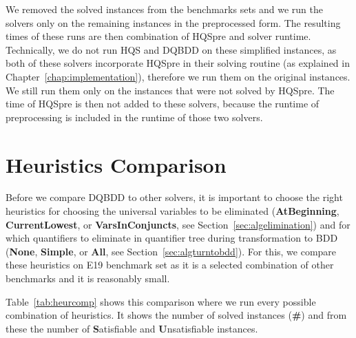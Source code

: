 \documentclass[
  digital, %
  color,
  twoside, %
  table,   %
  nolof,     %
  nolot,     %
]{fithesis3}
\theoremstyle{definition}
\theoremstyle{remark}
\newcommand{\QEnone}{\textbf{None}}
\newcommand{\QEsimple}{\textbf{Simple}}
\newcommand{\QEall}{\textbf{All}}
\newcommand{\QUatbeginning}{\textbf{At\-Be\-gin\-ning}}
\newcommand{\QUcurrentlowest}{\textbf{CurrentLowest}}
\newcommand{\QUvarsinconjuncts}{\textbf{VarsInConjuncts}}
\begin{document}
We removed the solved instances from the benchmarks sets and we run the solvers only on the remaining instances in the preprocessed form. The resulting times of these runs are then combination of HQSpre and solver runtime. Technically, we do not run HQS and DQBDD on these simplified instances, as both of these solvers incorporate HQSpre in their solving routine (as explained in Chapter~\ref{chap:implementation}), therefore we run them on the original instances. We still run them only on the instances that were not solved by HQSpre. The time of HQSpre is then not added to these solvers, because the runtime of preprocessing is included in the runtime of those two solvers.

\section{Heuristics Comparison}
Before we compare DQBDD to other solvers, it is important to choose the right heuristics for choosing the universal variables to be eliminated (\QUatbeginning{}, \QUcurrentlowest{}, or \QUvarsinconjuncts{}, see Section~\ref{sec:algelimination}) and for which quantifiers to eliminate in quantifier tree during transformation to BDD (\QEnone{}, \QEsimple{}, or \QEall{}, see Section~\ref{sec:algturntobdd}). For this, we compare these heuristics on E19 benchmark set as it is a selected combination of other benchmarks and it is reasonably small. 

Table~\ref{tab:heurcomp} shows this comparison where we run every possible combination of heuristics. It shows the number of solved instances (\textbf{\#}) and from these the number of \textbf{S}atisfiable and \textbf{U}n\-sa\-ti\-sfi\-able instances. 
\end{document}
